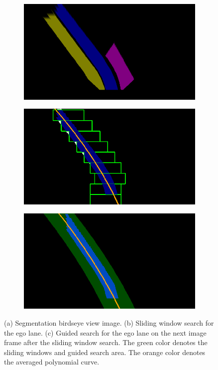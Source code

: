 \begin{figure}[h]
  \centering
  \begin{subfigure}[b]{0.32\linewidth}
    \includegraphics[width=\linewidth]{figures/segmentation-birdseye-view.png}
    \caption{}
  \end{subfigure}
  \begin{subfigure}[b]{0.32\linewidth}
    \includegraphics[width=\linewidth]{figures/sliding-window-search.png}
    \caption{}
  \end{subfigure}
  \begin{subfigure}[b]{0.32\linewidth}
    \includegraphics[width=\linewidth]{figures/guided-search.png}
    \caption{}
  \end{subfigure}
  \caption[Lane searching in birdseye view]{(a) Segmentation birdseye view
    image. (b) Sliding window search for the ego lane. (c) Guided search for
    the ego lane on the next image frame after the sliding window search.
    The green color denotes the sliding windows and guided search area. The
    orange color denotes the averaged polynomial curve.}
  \label{figure:lane-searches}
\end{figure}

